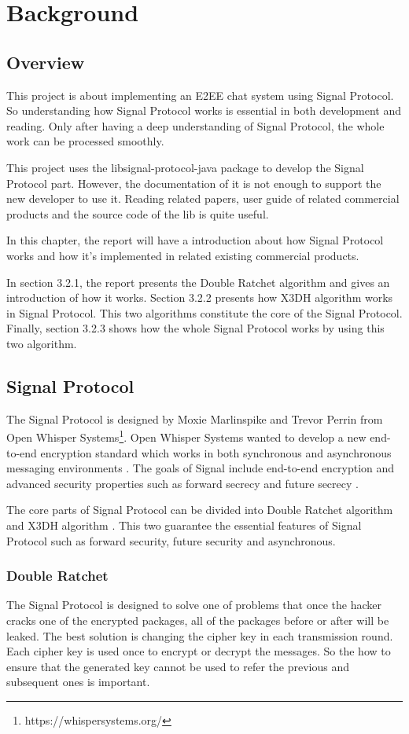\section{Background}

\subsection{Overview}
This project is about implementing an E2EE chat system using Signal Protocol. So understanding how Signal Protocol works is essential in both development and reading. Only after having a deep understanding of Signal Protocol, the whole work can be processed smoothly.

This project uses the libsignal-protocol-java package to develop the Signal Protocol part. However, the documentation of it is not enough to support the new developer to use it. Reading related papers, user guide of related commercial products and the source code of the lib is quite useful.

In this chapter, the report will have a introduction about how Signal Protocol works and how it's implemented in related existing commercial products.

In section 3.2.1, the report presents the Double Ratchet algorithm and gives an introduction of how it works. Section 3.2.2 presents how X3DH algorithm works in Signal Protocol. This two algorithms constitute the core of the Signal Protocol. Finally, section 3.2.3 shows how the whole Signal Protocol works by using this two algorithm.

\subsection{Signal Protocol}
The Signal Protocol is designed by Moxie Marlinspike and Trevor Perrin from Open Whisper Systems\footnote{https://whispersystems.org/}. Open Whisper Systems wanted to develop a new end-to-end encryption standard which works in both synchronous and asynchronous messaging environments \citep{SignalRef1}. The goals of Signal include end-to-end encryption and advanced security properties such as forward secrecy and future secrecy \citep{SignalRef2}.

The core parts of Signal Protocol can be divided into Double Ratchet algorithm \citep{DR} and X3DH algorithm \citep{X3DH}. This two guarantee the essential features of Signal Protocol such as forward security, future security and asynchronous.

\subsubsection{Double Ratchet}
The Signal Protocol is designed to solve one of problems that once the hacker cracks one of the encrypted packages, all of the packages before or after will be leaked. The best solution is changing the cipher key in each transmission round. Each cipher key is used once to encrypt or decrypt the messages. So the how to ensure that the generated key cannot be used to refer the previous and subsequent ones is important.


